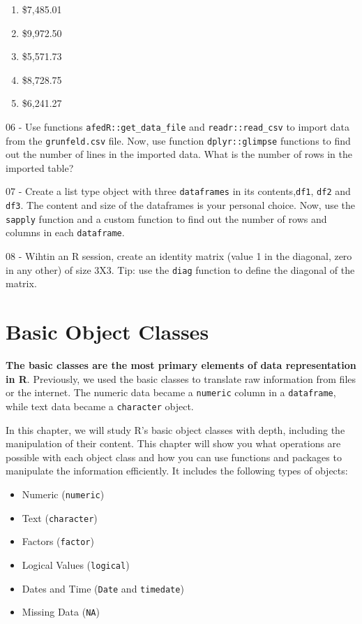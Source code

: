 \documentclass[
  12pt,
]{book}
\providecommand{\tightlist}{%
  \setlength{\itemsep}{0pt}\setlength{\parskip}{0pt}}
\begin{document}
\begin{enumerate}
\def\labelenumi{\alph{enumi})}
\tightlist
\item
  \$7,485.01
\item
  \$9,972.50
\item
  \$5,571.73
\item
  \$8,728.75
\item
  \$6,241.27
\end{enumerate}

06 -
Use functions \texttt{afedR::get\_data\_file} and \texttt{readr::read\_csv} to import data from the \texttt{grunfeld.csv} file. Now, use function \texttt{dplyr::glimpse} functions to find out the number of lines in the imported data. What is the number of rows in the imported table?

07 -
Create a list type object with three \texttt{dataframes} in its contents,\texttt{df1}, \texttt{df2} and \texttt{df3}. The content and size of the dataframes is your personal choice. Now, use the \texttt{sapply} function and a custom function to find out the number of rows and columns in each \texttt{dataframe}.

08 -
Wihtin an R session, create an identity matrix (value 1 in the diagonal, zero in any other) of size 3X3. Tip: use the \texttt{diag} function to define the diagonal of the matrix.

\hypertarget{basic-classes}{%
\chapter{Basic Object Classes}\label{basic-classes}}

\textbf{The basic classes are the most primary elements of data representation in R}. Previously, we used the basic classes to translate raw information from files or the internet. The numeric data became a \texttt{numeric} column in a \texttt{dataframe}, while text data became a \texttt{character} object.

In this chapter, we will study R's basic object classes with depth, including the manipulation of their content. This chapter will show you what operations are possible with each object class and how you can use functions and packages to manipulate the information efficiently. It includes the following types of objects:

\begin{itemize}
\tightlist
\item
  Numeric (\texttt{numeric})
\item
  Text (\texttt{character})
\item
  Factors (\texttt{factor})
\item
  Logical Values (\texttt{logical})
\item
  Dates and Time (\texttt{Date} and \texttt{timedate})
\item
  Missing Data (\texttt{NA})
\end{itemize}
\end{document}
